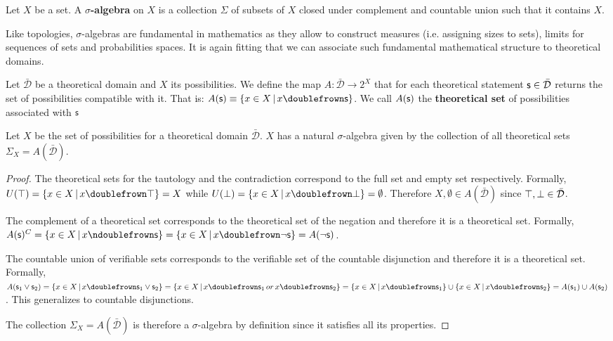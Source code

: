 \documentclass[11pt,letterpaper,fleqn]{memoir} %
\begin{document}
\begin{mathSection}
	\begin{defn}
		Let $X$ be a set. A \textbf{$\sigma$-algebra} on $X$ is a collection $\Sigma$ of subsets of $X$ closed under complement and countable union such that it contains $X$.
	\end{defn}
\end{mathSection}

Like topologies, $\sigma$-algebras are fundamental in mathematics as they allow to construct measures (i.e. assigning sizes to sets), limits for sequences of sets and probabilities spaces. It is again fitting that we can associate such fundamental mathematical structure to theoretical domains.

\begin{mathSection}
	
	\begin{defn}
		Let $\bar{\mathcal{D}}$ be a theoretical domain and $X$ its possibilities. We define the map $A : \bar{\mathcal{D}} \rightarrow 2^X$ that for each theoretical statement $\mathsf{s} \in \bar{\mathcal{D}}$ returns the set of possibilities compatible with it. That is: $A(\stmt)\equiv\{ x \in X \, | \, x \comp \stmt\}$. We call $A(\mathsf{s})$ the \textbf{theoretical set} of possibilities associated with $\mathsf{s}$
	\end{defn}
	
	\begin{prop}
		Let $X$ be the set of possibilities for a theoretical domain $\bar{\mathcal{D}}$. $X$ has a natural $\sigma$-algebra given by the collection of all theoretical sets $\Sigma_X=A(\bar{\mathcal{D}})$.
	\end{prop}
	
	\begin{proof}
	The theoretical sets for the tautology and the contradiction correspond to the full set and empty set respectively. Formally, $U(\tautology) = \{ x \in X \, | \, x \comp \tautology\} = X$ while $U(\contradiction) = \{ x \in X \, | \, x \comp \contradiction\} = \emptyset$. Therefore $X, \emptyset \in A(\bar{\mathcal{D}})$ since $\top, \bot \in \bar{\mathcal{D}}$.

	The complement of a theoretical set corresponds to the theoretical set of the negation and therefore it is a theoretical set. Formally, $A(\stmt)^C = \{ x \in X \, | \, x \ncomp \stmt\} =  \{ x \in X \, | \, x \comp \NOT\stmt\} = A(\NOT\stmt)$.

	The countable union of verifiable sets corresponds to the verifiable set of the countable disjunction and therefore it is a theoretical set. Formally, $A(\stmt_1\OR\stmt_2) = \{ x \in X \, | \, x \comp \stmt_1\OR\stmt_2\} =  \{ x \in X \, | \, x \comp \stmt_1 \, or \, x \comp \stmt_2\} = \{ x \in X \, | \, x \comp \stmt_1\} \cup \{ x \in X \, | \, x \comp \stmt_2\} = A(\stmt_1) \cup A(\stmt_2)$. This generalizes to countable disjunctions.

	The collection $\Sigma_X=A(\bar{\mathcal{D}})$ is therefore a $\sigma$-algebra by definition since it satisfies all its properties.
	\end{proof}
\end{mathSection}
\end{document}
